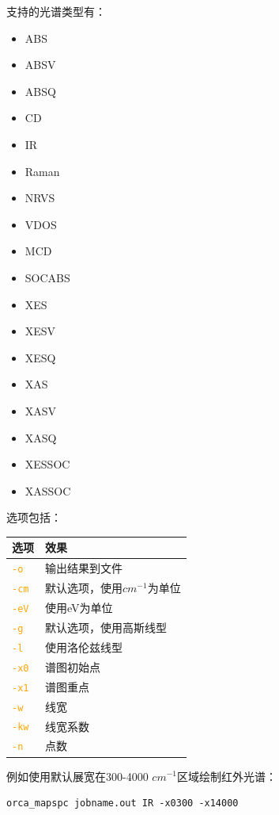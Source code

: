 \documentclass{ctexart}
\newcommand{\cmd}[1]{\textcolor{orange}{ \texttt{#1} }}
\begin{document}
	支持的光谱类型有：
	\begin{itemize}
		\item ABS	
		\item ABSV	
		\item ABSQ	
		\item CD	
		\item IR	
		\item Raman
		\item NRVS	
		\item VDOS	
		\item MCD	
		\item SOCABS	
		\item XES	
		\item XESV
		\item XESQ	
		\item XAS	
		\item XASV	
		\item XASQ	
		\item XESSOC	
		\item XASSOC
	\end{itemize}
	
	
	选项包括：
	
	\begin{table}[H]
		\centering
		\begin{tabular}{ll}
			\toprule
			\textbf{选项}    & \textbf{效果}                  \\
			\midrule
			\cmd{-o}  & 输出结果到文件             \\
			\cmd{-cm} & 默认选项，使用$cm^{-1}$为单位 \\
			\cmd{-eV} & 使用eV为单位             \\
			\cmd{-g}  & 默认选项，使用高斯线型         \\
			\cmd{-l}  & 使用洛伦兹线型             \\
			\cmd{-x0} & 谱图初始点               \\
			\cmd{-x1}& 谱图重点                \\
			\cmd{-w}  & 线宽                  \\
			\cmd{-kw} & 线宽系数                \\
			\cmd{-n}  & 点数           \\
			\midrule      
		\end{tabular}
	\end{table}
	
	例如使用默认展宽在300-4000 $cm^{-1}$区域绘制红外光谱：
	
	\begin{lstlisting}
orca_mapspc jobname.out IR -x0300 -x14000
	\end{lstlisting}
	
\end{document}
